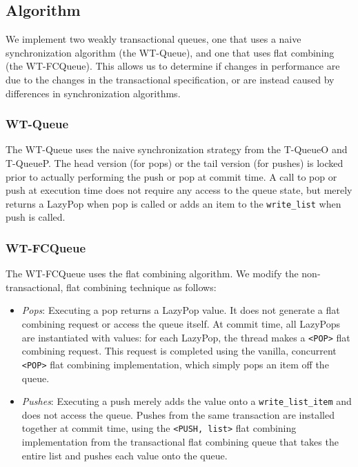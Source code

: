 \subsection{Algorithm}

We implement two weakly transactional queues, one that uses a naive synchronization algorithm (the WT-Queue), and one that uses flat combining (the WT-FCQueue). This allows us to determine if changes in performance are due to the changes in the transactional specification, or are instead caused by differences in synchronization algorithms.

\subsubsection{WT-Queue}
The WT-Queue uses the naive synchronization strategy from the T-QueueO and T-QueueP. The head version (for pops) or the tail version (for pushes) is locked prior to actually performing the push or pop at commit time. A call to pop or push at execution time does not require any access to the queue state, but merely returns a LazyPop when pop is called or adds an item to the \texttt{write\_list} when push is called.

\subsubsection{WT-FCQueue}
The WT-FCQueue uses the flat combining algorithm. We modify the non-transactional, flat combining technique as follows:
\begin{itemize}
    \item \emph{Pops}: 
    Executing a pop returns a LazyPop value. It does not generate a flat combining request or access the queue itself. At commit time, all LazyPops are instantiated with values: for each LazyPop, the thread makes a \texttt{<POP>} flat combining request. This request is completed using the vanilla, concurrent \texttt{<POP>} flat combining implementation, which simply pops an item off the queue.

    \item \emph{Pushes}: 
    Executing a push merely adds the value onto a \texttt{write\_list\_item} and does not access the queue. Pushes from the same transaction are installed together at commit time, using the \texttt{<PUSH, list>} flat combining implementation from the transactional flat combining queue that takes the entire list and pushes each value onto the queue.
\end{itemize}

